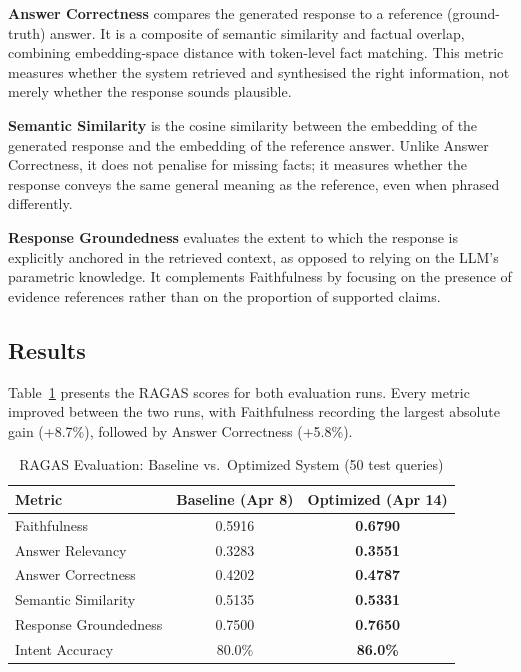 \documentclass[conference]{IEEEtran}
\begin{document}
\textbf{Answer Correctness} compares the generated response to a reference
(ground-truth) answer. It is a composite of semantic similarity and factual
overlap, combining embedding-space distance with token-level fact matching.
This metric measures whether the system retrieved and synthesised the right
information, not merely whether the response sounds plausible.

\textbf{Semantic Similarity} is the cosine similarity between the embedding of the
generated response and the embedding of the reference answer. Unlike Answer
Correctness, it does not penalise for missing facts; it measures whether the
response conveys the same general meaning as the reference, even when phrased
differently.

\textbf{Response Groundedness} evaluates the extent to which the response is
explicitly anchored in the retrieved context, as opposed to relying on the LLM's
parametric knowledge. It complements Faithfulness by focusing on the presence of
evidence references rather than on the proportion of supported claims.

\subsection{Results}
Table~\ref{tab:ragas} presents the RAGAS scores for both evaluation runs.
Every metric improved between the two runs, with Faithfulness recording the largest
absolute gain (+8.7\%), followed by Answer Correctness (+5.8\%).

\begin{table}[h]
\centering
\caption{RAGAS Evaluation: Baseline vs.\ Optimized System (50 test queries)}
\label{tab:ragas}
\begin{tabular}{lcc}
\toprule
\textbf{Metric} & \textbf{Baseline (Apr 8)} & \textbf{Optimized (Apr 14)} \\
\midrule
Faithfulness           & 0.5916 & \textbf{0.6790} \\
Answer Relevancy       & 0.3283 & \textbf{0.3551} \\
Answer Correctness     & 0.4202 & \textbf{0.4787} \\
Semantic Similarity    & 0.5135 & \textbf{0.5331} \\
Response Groundedness  & 0.7500 & \textbf{0.7650} \\
\midrule
Intent Accuracy        & 80.0\%  & \textbf{86.0\%}  \\
\bottomrule
\end{tabular}
\end{table}
\end{document}
